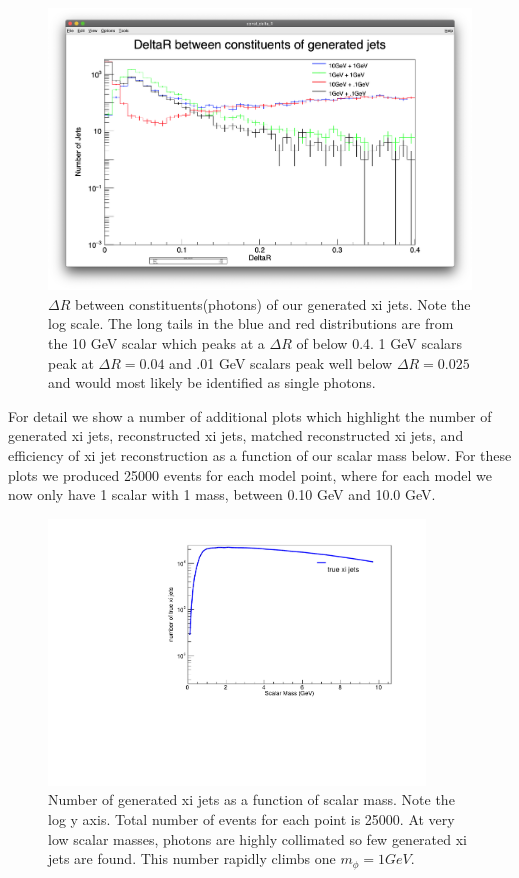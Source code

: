 \documentclass[aps,onecolumn,twoside,secnumarabic,balancelastpage,amsmath,amssymb,nofootinbib,hyperref=pdftex]{revtex4}
\begin{document}
\begin{figure}[t]
\begin{center}
\includegraphics[width=13cm]{deltaR_const.png}

\caption{$\Delta R$ between constituents(photons) of our generated xi jets. Note the log scale. The long tails in the blue and red distributions are from the 10 GeV scalar which peaks at a $\Delta R$ of below 0.4. 1 GeV scalars peak at $\Delta R = 0.04$ and .01 GeV scalars peak well below $\Delta R = 0.025$ and would most likely be identified as single photons.}
\label{fig:const}
\end{center}
\end{figure}

For detail we show a number of additional plots which highlight the number of generated xi jets, reconstructed xi jets, matched reconstructed xi jets, and efficiency of xi jet reconstruction as a function of our scalar mass below. For these plots we produced 25000 events for each model point, where for each model we now only have 1 scalar with 1 mass, between 0.10 GeV and 10.0 GeV. 

\begin{figure}[t]
\begin{center}
\includegraphics[width=10cm]{true_xi_jets.pdf}

\caption{Number of generated xi jets as a function of scalar mass. Note the log y axis. Total number of events for each point is 25000. At very low scalar masses, photons are highly collimated so few generated xi jets are found. This number rapidly climbs one $m_{\phi} = 1 GeV$.}
\label{default}
\end{center}
\end{figure}
\end{document}
